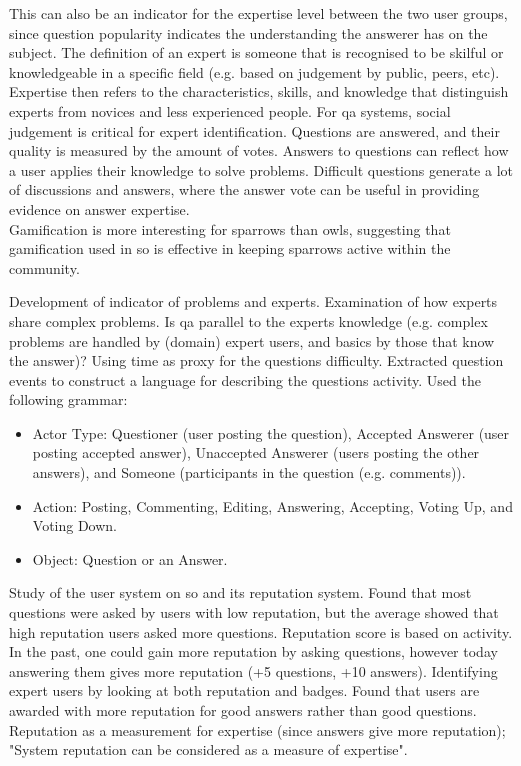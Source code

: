 This can also be an indicator for the expertise level between the two user groups, since question popularity indicates the understanding the answerer has on the subject.
The definition of an expert is someone that is recognised to be skilful or knowledgeable in a specific field (e.g. based on judgement by public, peers, etc). 
Expertise then refers to the characteristics, skills, and knowledge that distinguish experts from novices and less experienced people.
For \gls{qa} systems, social judgement is critical for expert identification. Questions are answered, and their quality is measured by the amount of votes.
Answers to questions can reflect how a user applies their knowledge to solve problems. 
Difficult questions generate a lot of discussions and answers, where the answer vote can be useful in providing evidence on answer expertise. \\
Gamification is more interesting for sparrows than owls, suggesting that gamification used in \gls{so} is effective in keeping sparrows active within the community.
\cite{Yang2014}

Development of indicator of problems and experts. Examination of how experts share complex problems.
Is \gls{qa} parallel to the experts knowledge (e.g. complex problems are handled by (domain) expert users, and basics by those that know the answer)?
Using time as proxy for the questions difficulty. Extracted question events to construct a language for describing the questions activity. 
Used the following grammar: 
\begin{itemize}
	\item Actor Type: Questioner (user posting the question), 	Accepted Answerer (user posting accepted answer), 
	Unaccepted Answerer (users posting the other answers), and Someone (participants in the question (e.g. comments)).
	\item Action: Posting, Commenting, Editing, Answering, Accepting, Voting Up, and Voting Down. 
	\item Object: Question or an Answer. 
\end{itemize}
\cite{Hanrahan2012}

Study of the user system on \gls{so} and its reputation system. 
Found that most questions were asked by users with low reputation, but the average showed that high reputation users asked more questions. 
Reputation score is based on activity.
In the past, one could gain more reputation by asking questions, however today answering them gives more reputation (+5 questions, +10 answers).
Identifying expert users by looking at both reputation and badges.
Found that users are awarded with more reputation for good answers rather than good questions. 
Reputation as a measurement for expertise (since answers give more reputation); "System reputation can be considered as a measure of expertise".    
\cite{Movshovitz-Attias2013}

